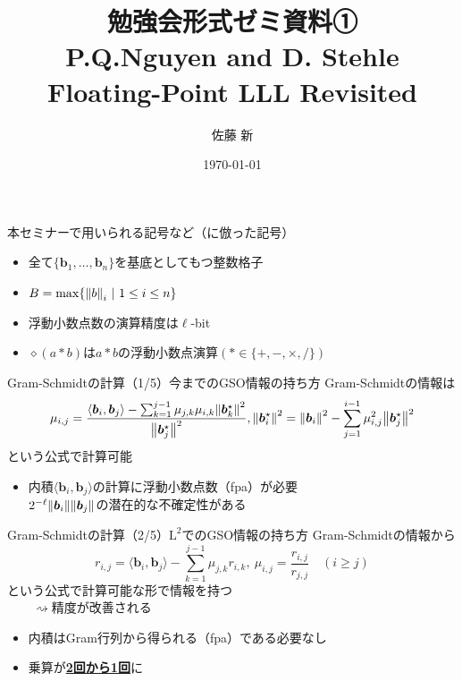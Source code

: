 \documentclass[12pt,aspectratio=169,table,dvipdfmx, leqno]{beamer}
\title[勉強会]{勉強会形式ゼミ資料①\\P.Q.Nguyen and D. Stehle Floating-Point LLL Revisited\cite{NS05}}
\author[佐藤]{佐藤 新}
\date{\today}
\begin{document}
\maketitle

\begin{frame}
    本セミナーで用いられる記号など（\cite{NS05}に倣った記号）
    \begin{itemize}
        \item 全て$\{\bm{b}_1,\ldots,\bm{b}_n\}$を基底としてもつ整数格子
        \item $B=\max\{\norm{b}_i~|~1\le i\le n\}$
        \item 浮動小数点数の演算精度は$\ell$-bit
        \item $\diamond(a*b)$は$a*b$の浮動小数点演算$(*\in\{+, -, \times, /\})$
    \end{itemize}
\end{frame}

\begin{frame}{Gram-Schmidtの計算（1/5）}{今までのGSO情報の持ち方}
    Gram-Schmidtの情報は
    \[
    \mu_{i, j}=\frac{\langle \bm{b}_i, \bm{b}_j\rangle-\sum_{k=1}^{j-1}\mu_{j, k}\mu_{i, k}\norm{\bm{b}_k^\star}^2}{\norm{\bm{b}_j^\star}^2}, \norm{\bm{b}_i^\star}^2=\norm{\bm{b}_i}^2-\sum_{j=1}^{i-1}\mu_{i, j}^2\norm{\bm{b}_j^\star}^2
    \]
    という公式で計算可能

    \begin{itemize}
        \item 内積$\langle \bm{b}_i, \bm{b}_j\rangle$の計算に浮動小数点数（fpa）が必要\\
        \quad\quad $2^{-\ell}\norm{\bm{b}_i}\norm{\bm{b}_j}$の潜在的な不確定性がある
    \end{itemize}
\end{frame}

\begin{frame}{Gram-Schmidtの計算（2/5）}{$\text{L}^2$でのGSO情報の持ち方}
    Gram-Schmidtの情報から
    \[
    r_{i, j}=\langle \bm{b}_i, \bm{b}_j\rangle-\sum_{k=1}^{j-1}\mu_{j, k}r_{i, k},~\mu_{i, j}=\frac{r_{i, j}}{r_{j, j}}\quad(i\ge j)
    \]
    という公式で計算可能な形で情報を持つ\\
    $\quad\quad\rightsquigarrow$精度が改善される
    \begin{itemize}
        \item 内積はGram行列から得られる（fpa）である必要なし
        \item 乗算が\underline{\textbf{2回から1回}}に
    \end{itemize}
\end{frame}
\end{document}
